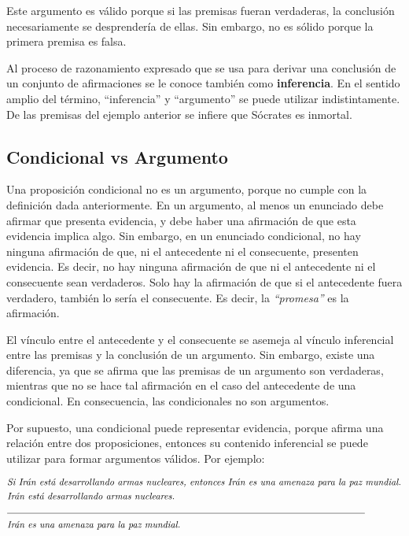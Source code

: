 Este argumento es válido porque si las premisas fueran verdaderas, la conclusión necesariamente se desprendería de ellas. Sin embargo, no es sólido porque la primera premisa es falsa.

Al proceso de razonamiento expresado que se usa para derivar una conclusión de un conjunto de afirmaciones se le conoce también como \textbf{inferencia}. En el sentido amplio del término, “inferencia” y “argumento” se puede utilizar indistintamente. De las premisas del ejemplo anterior se infiere que Sócrates es inmortal.

\subsection{Condicional vs Argumento}

Una proposición condicional no es un argumento, porque no cumple con la definición dada anteriormente. En un argumento, al menos un enunciado debe afirmar que presenta evidencia, y debe haber una afirmación de que esta evidencia implica algo. Sin embargo, en un enunciado condicional, no hay ninguna afirmación de que, ni el antecedente ni el consecuente, presenten evidencia. Es decir, no hay ninguna afirmación de que ni el antecedente ni el consecuente sean verdaderos. Solo hay la afirmación de que si el antecedente fuera verdadero, también lo sería el consecuente. Es decir, la \textit{``promesa''} es la afirmación.

El vínculo entre el antecedente y el consecuente se asemeja al vínculo inferencial entre las premisas y la conclusión de un argumento. Sin embargo, existe una diferencia, ya que se afirma que las premisas de un argumento son verdaderas, mientras que no se hace tal afirmación en el caso del antecedente de una condicional. En consecuencia, las condicionales no son argumentos. 

Por supuesto, una condicional puede representar evidencia, porque afirma una relación entre dos proposiciones, entonces su contenido inferencial se puede utilizar para formar argumentos válidos. Por ejemplo:

\begin{equation*}
    \begin{split}
        & \textit{Si Irán está desarrollando armas nucleares, entonces Irán es una amenaza para la paz mundial.} \\
        & \textit{Irán está desarrollando armas nucleares.} \\
        & \text{\noindent\rule{38em}{0.4pt}} \\
        & \textit{Irán es una amenaza para la paz mundial.}
    \end{split}
\end{equation*}


